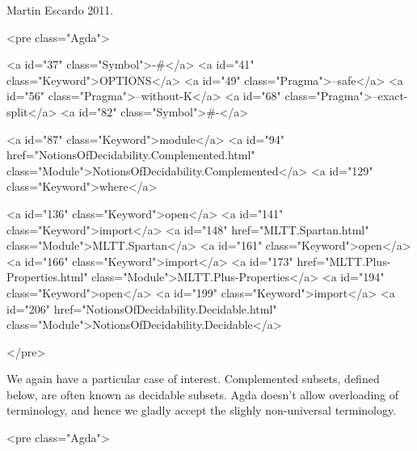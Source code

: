 Martin Escardo 2011.

<pre class="Agda">

<a id="37" class="Symbol">{-#</a> <a id="41" class="Keyword">OPTIONS</a> <a id="49" class="Pragma">--safe</a> <a id="56" class="Pragma">--without-K</a> <a id="68" class="Pragma">--exact-split</a> <a id="82" class="Symbol">#-}</a>

<a id="87" class="Keyword">module</a> <a id="94" href="NotionsOfDecidability.Complemented.html" class="Module">NotionsOfDecidability.Complemented</a> <a id="129" class="Keyword">where</a>

<a id="136" class="Keyword">open</a> <a id="141" class="Keyword">import</a> <a id="148" href="MLTT.Spartan.html" class="Module">MLTT.Spartan</a>
<a id="161" class="Keyword">open</a> <a id="166" class="Keyword">import</a> <a id="173" href="MLTT.Plus-Properties.html" class="Module">MLTT.Plus-Properties</a>
<a id="194" class="Keyword">open</a> <a id="199" class="Keyword">import</a> <a id="206" href="NotionsOfDecidability.Decidable.html" class="Module">NotionsOfDecidability.Decidable</a>

</pre>

We again have a particular case of interest.  Complemented subsets,
defined below, are often known as decidable subsets. Agda doesn't
allow overloading of terminology, and hence we gladly accept the
slighly non-universal terminology.

<pre class="Agda">

